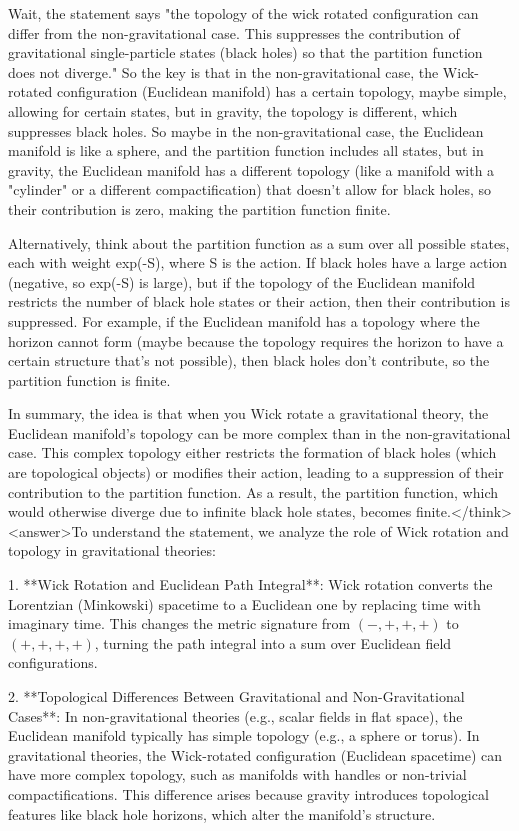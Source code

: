 Wait, the statement says "the topology of the wick rotated configuration can differ from the non-gravitational case. This suppresses the contribution of gravitational single-particle states (black holes) so that the partition function does not diverge." So the key is that in the non-gravitational case, the Wick-rotated configuration (Euclidean manifold) has a certain topology, maybe simple, allowing for certain states, but in gravity, the topology is different, which suppresses black holes. So maybe in the non-gravitational case, the Euclidean manifold is like a sphere, and the partition function includes all states, but in gravity, the Euclidean manifold has a different topology (like a manifold with a "cylinder" or a different compactification) that doesn't allow for black holes, so their contribution is zero, making the partition function finite.

Alternatively, think about the partition function as a sum over all possible states, each with weight exp(-S), where S is the action. If black holes have a large action (negative, so exp(-S) is large), but if the topology of the Euclidean manifold restricts the number of black hole states or their action, then their contribution is suppressed. For example, if the Euclidean manifold has a topology where the horizon cannot form (maybe because the topology requires the horizon to have a certain structure that's not possible), then black holes don't contribute, so the partition function is finite.

In summary, the idea is that when you Wick rotate a gravitational theory, the Euclidean manifold's topology can be more complex than in the non-gravitational case. This complex topology either restricts the formation of black holes (which are topological objects) or modifies their action, leading to a suppression of their contribution to the partition function. As a result, the partition function, which would otherwise diverge due to infinite black hole states, becomes finite.</think><answer>To understand the statement, we analyze the role of Wick rotation and topology in gravitational theories:  

1. **Wick Rotation and Euclidean Path Integral**:  
   Wick rotation converts the Lorentzian (Minkowski) spacetime to a Euclidean one by replacing time with imaginary time. This changes the metric signature from \((-,+,+,+)\) to \((+,+,+,+)\), turning the path integral into a sum over Euclidean field configurations.  

2. **Topological Differences Between Gravitational and Non-Gravitational Cases**:  
   In non-gravitational theories (e.g., scalar fields in flat space), the Euclidean manifold typically has simple topology (e.g., a sphere or torus). In gravitational theories, the Wick-rotated configuration (Euclidean spacetime) can have more complex topology, such as manifolds with handles or non-trivial compactifications. This difference arises because gravity introduces topological features like black hole horizons, which alter the manifold’s structure.  

